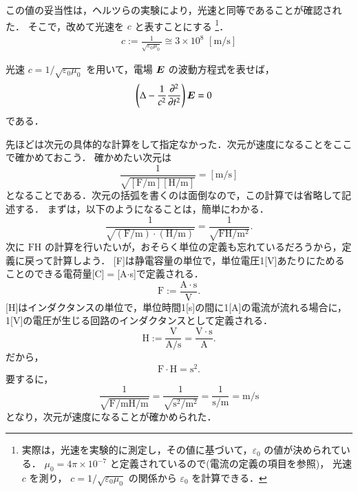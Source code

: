             この値の妥当性は，ヘルツらの実験により，光速と同等であることが確認された．
            そこで，改めて光速を $c$ と表すことにする
                \footnote{
                    実際は，光速を実験的に測定し，その値に基づいて，$\varepsilon_{0}$ の値が決められている．
                    $\mu_{0}=4\pi \times 10^{-7}$ と定義されているので(電流の定義の項目を参照)，
                    光速 $c$ を測り， $c=1/\sqrt{\varepsilon_{0} \mu_{0}}$ の関係から $\varepsilon_{0}$ を計算できる．
                }．
            \begin{align}
                c:=\frac{1}{\sqrt{\varepsilon_{0}\mu_{0}}}\cong 3\times 10^{8} \,\, \mathrm{[m/s]}
            \end{align}

            光速 $c=1/\sqrt{\varepsilon_{0} \mu_{0}}$ を用いて，電場 $\boldsymbol{E}$ の波動方程式を表せば，
            \begin{align}
                \left(\Delta-\frac{1}{c^{2}}
                \frac{\partial^{2}}{\partial t^{2}}\right)\boldsymbol{E}
                &=0
            \end{align}
            である．

             先ほどは次元の具体的な計算をして指定なかった．次元が速度になることをここで確かめておこう．
             確かめたい次元は
                \[
                    \frac{1}{\sqrt{\mathrm{[F/m]} \mathrm{[H/m]}}} = \mathrm{[m/s]}
                \]
            となることである．次元の括弧を書くのは面倒なので，この計算では省略して記述する．
            まずは，以下のようになることは，簡単にわかる．
                \[
                    \frac{1}{\sqrt{\mathrm{(F/m)} \cdot \mathrm{(H/m)}}} = \frac{1}{\sqrt{\mathrm{FH}/\mathrm{m}^{2}}}.
                \]
            次に $\mathrm{FH}$ の計算を行いたいが，おそらく単位の定義も忘れているだろうから，定義に戻って計算しよう．
            [F]は静電容量の単位で，単位電圧1[V]あたりにためることのできる電荷量[C]$=$[A$\cdot$s]で定義される．
                \[
                    \mathrm{F} := \frac{\mathrm{A}\cdot\mathrm{s}}{\mathrm{V}}.
                \]
            [H]はインダクタンスの単位で，単位時間1[s]の間に1[A]の電流が流れる場合に，
            1[V]の電圧が生じる回路のインダクタンスとして定義される．
                \[
                    \mathrm{H} := \frac{\mathrm{V}}{\mathrm{A/s}} = \frac{\mathrm{V}\cdot\mathrm{s}}{\mathrm{A}}.
                \]
            だから，
                \[
                    \mathrm{F}\cdot\mathrm{H} = \mathrm{s}^{2}.
                \]
            要するに，
                \[
                    \frac{1}{\sqrt{\mathrm{F/m} \mathrm{H/m}}}  = \frac{1}{\sqrt{\mathrm{s}^{2}/\mathrm{m}^{2}}}
                                                                = \frac{1}{\mathrm{s}/\mathrm{m}}
                                                                = \mathrm{m}/\mathrm{s}
                \]
            となり，次元が速度になることが確かめられた．

